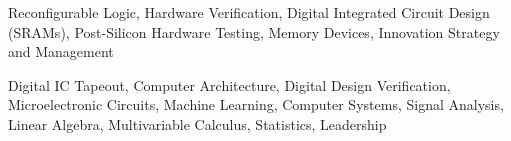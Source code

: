 \item Reconfigurable Logic, Hardware Verification, Digital Integrated Circuit Design (SRAMs), Post-Silicon Hardware Testing, Memory Devices, Innovation Strategy and Management

\item Digital IC Tapeout, Computer Architecture, Digital Design Verification, Microelectronic Circuits, Machine Learning, Computer Systems, Signal Analysis, Linear Algebra, Multivariable Calculus, Statistics, Leadership
